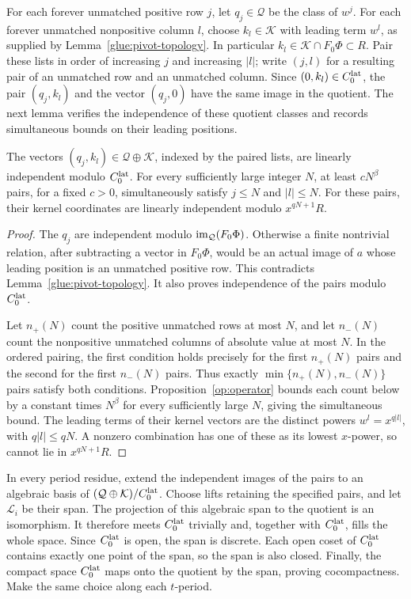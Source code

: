 For each forever unmatched positive row $j$, let $q_j\in\mathcal Q$
be the class of $w^j$. For each forever unmatched nonpositive column
$l$, choose $k_l\in\mathcal K$ with leading term $w^l$, as supplied
by Lemma~\ref{glue:pivot-topology}. In particular
$k_l\in\mathcal K\cap F_0\Phi\subset R$. Pair these lists in order
of increasing $j$ and increasing $|l|$; write $(j,l)$ for a resulting
pair of an unmatched row and an unmatched column.
Since $(0,k_l)\in C_0^{\rm lat}$, the pair $(q_j,k_l)$ and the
vector $(q_j,0)$ have the same image in the quotient. The next lemma
verifies the independence of these quotient classes and records
simultaneous bounds on their leading positions.

\begin{lemma}
\label{glue:pairs}
The vectors $(q_j,k_l)\in\mathcal Q\oplus\mathcal K$, indexed by
the paired lists, are linearly independent modulo $C_0^{\rm lat}$.
For every sufficiently large integer $N$, at least $cN^\beta$ pairs,
for a fixed $c>0$, simultaneously satisfy $j\le N$ and $|l|\le N$.
For these pairs, their kernel coordinates are linearly independent
modulo $x^{qN+1}R$.
\end{lemma}

\begin{proof}
The $q_j$ are independent modulo $\operatorname{im}_{\mathcal Q}(F_0\Phi)$.
Otherwise a finite nontrivial relation, after subtracting a vector in
$F_0\Phi$, would be an actual image of $a$ whose leading position
is an unmatched positive row. This contradicts
Lemma~\ref{glue:pivot-topology}. It also proves independence of the
pairs modulo $C_0^{\rm lat}$.

Let $n_+(N)$ count the positive unmatched rows at most $N$, and let
$n_-(N)$ count the nonpositive unmatched columns of absolute value
at most $N$. In the ordered pairing, the first condition holds
precisely for the first $n_+(N)$ pairs and the second for the first
$n_-(N)$ pairs. Thus exactly $\min\{n_+(N),n_-(N)\}$ pairs satisfy both
conditions. Proposition~\ref{op:operator} bounds each count below
by a constant times $N^\beta$ for every sufficiently large $N$,
giving the simultaneous bound.
The leading terms of their kernel vectors are the distinct powers
$w^l=x^{q|l|}$, with $q|l|\le qN$. A nonzero combination has one of
these as its lowest $x$-power, so cannot lie in $x^{qN+1}R$.
\end{proof}

In every period residue, extend the independent images of the pairs
to an algebraic basis of
$(\mathcal Q\oplus\mathcal K)/C_0^{\rm lat}$. Choose lifts retaining
the specified pairs, and let $\mathcal L_i$ be their span. The
projection of this algebraic span to the quotient is an isomorphism.
It therefore meets $C_0^{\rm lat}$ trivially and, together with
$C_0^{\rm lat}$, fills the whole space. Since $C_0^{\rm lat}$ is
open, the span is discrete. Each open coset of $C_0^{\rm lat}$
contains exactly one point of the span, so the span is also closed.
Finally, the compact space $C_0^{\rm lat}$ maps onto the quotient
by the span, proving cocompactness. Make the same choice along each
$t$-period.

